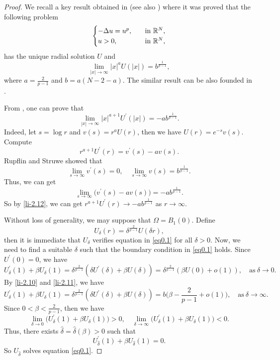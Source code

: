 \documentclass[12pt,reqno]{amsart}
\numberwithin{equation}{section}
\theoremstyle{definition}
\def\R{{\Bbb R}}
\begin{document}
\begin{proof}
We recall a key result obtained in \cite{SZ} (see also \cite{RS}) where it was proved that the following problem
\begin{equation}
\begin{cases}
-\Delta u=u^p,\quad &\text{in}\ \R^N,\\
u>0, &\text{in}\ \R^N,
\end{cases}
\end{equation}
has the unique radial solution $U$ and 
\begin{equation}\label{li-2.10}
\lim_{|x|\to\infty}|x|^{a}U(|x|)=b^{\frac{1}{p-1}},
\end{equation}
where $a=\frac{2}{p-1}$ and $b=a(N-2-a)$. The similar result can be also founded in \cite{SZ}. 

From \cite{RS}, one can prove that 
\begin{equation}\label{li-2.11}
\lim_{|x|\to\infty}|x|^{a+1}U^\prime(|x|)=-ab^{\frac{1}{p-1}}.
\end{equation}
Indeed, let $s=\log r$ and $v(s)=r^aU(r)$, then we have $U(r)=e^{-s}v(s)$. Compute 
\begin{equation}\label{li-2.12}
r^{a+1}U^\prime(r)=v^\prime(s)-av(s).
\end{equation}
Rupflin and Struwe \cite{RS} showed that 
$$
\lim_{s\to\infty}v^\prime(s)=0,\quad \lim_{s\to\infty}v(s)=b^{\frac{1}{p-1}}.
$$
Thus, we can get 
$$
\lim_{s\to\infty}\Big( v^\prime(s)-av(s)\Big)=-ab^{\frac{1}{p-1}}.
$$
So by \eqref{li-2.12}, we can get $r^{a+1}U^\prime(r)\to -ab^{\frac{1}{p-1}}$ as $r\to\infty$.

Without loss of generality, we may suppose that $\Omega=B_{1}(0)$. Define 
$$
U_\delta(r)=\delta^{\frac{2}{p-1}}U(\delta r),
$$
then it is immediate that $U_\delta$ verifies equation in \eqref{eq0.1} for all $\delta>0$. Now, we need to find a suitable $\delta$ such that the boundary condition in \eqref{eq0.1}  holds.  Since $U^\prime(0)=0$, we have 
\begin{equation*}
U_\delta^\prime(1)+\beta U_\delta(1)=\delta^{\frac{2}{p-1}}(\delta U^\prime(\delta)+\beta U(\delta))=\delta^{\frac{2}{p-1}}(\beta U(0)+o(1)),\quad \text{as}\ \delta\to 0.
\end{equation*}
By \eqref{li-2.10} and \eqref{li-2.11}, we have 
\begin{equation*}
U_\delta^\prime(1)+\beta U_\delta(1)=\delta^{\frac{2}{p-1}}(\delta U^\prime(\delta)+\beta U(\delta))=b\Big(\beta-\frac{2}{p-1}+o(1) \Big),\quad \text{as}\ \delta\to \infty.
\end{equation*}
Since $0<\beta<\frac{2}{p-1}$, then we have 
$$
\lim_{\delta\to 0}\Big(U_\delta^\prime(1)+\beta U_\delta(1)\Big)>0,\quad \lim_{\delta\to \infty}\Big(U_\delta^\prime(1)+\beta U_\delta(1)\Big)<0.
$$
Thus, there exists $\hat{\delta}=\hat{\delta}(\beta)>0$ such that 
$$
U_{\hat{\delta}}^\prime(1)+\beta U_{\hat{\delta}}(1)=0.
$$
So $U_{\hat{\delta}}$ solves equation \eqref{eq0.1}.
\end{proof}
\end{document}
